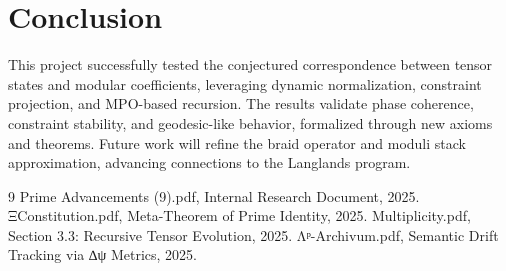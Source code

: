 \documentclass[11pt]{article}
\begin{document}
\section{Conclusion}
This project successfully tested the conjectured correspondence between tensor states and modular coefficients, leveraging dynamic normalization, constraint projection, and MPO-based recursion. The results validate phase coherence, constraint stability, and geodesic-like behavior, formalized through new axioms and theorems. Future work will refine the braid operator and moduli stack approximation, advancing connections to the Langlands program.

\begin{thebibliography}{9}
Prime Advancements (9).pdf, Internal Research Document, 2025.
ΞConstitution.pdf, Meta-Theorem of Prime Identity, 2025.
Multiplicity.pdf, Section 3.3: Recursive Tensor Evolution, 2025.
Λᵖ-Archivum.pdf, Semantic Drift Tracking via ∆ψ Metrics, 2025.
\end{thebibliography}
\end{document}
